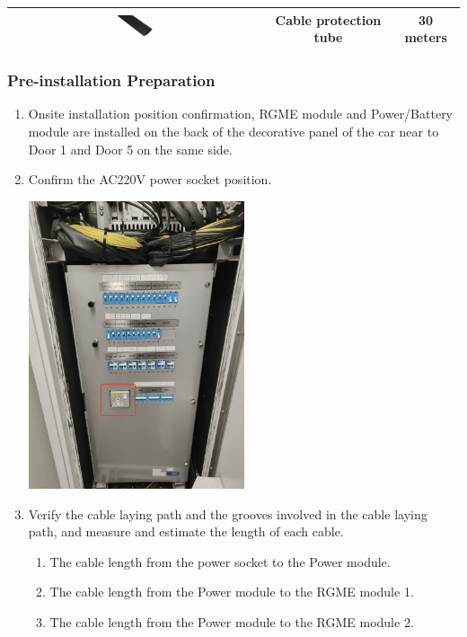 \documentclass{article}
\begin{document}
\begin{table}[H]
\begin{tabular}{|c|c|c|}
        \includegraphics[width=0.15\textwidth]{线缆保护管.png}                 & Cable protection tube                         & 30 meters\\ \hline
    \end{tabular}
\end{table}
\subsubsection{Pre-installation Preparation}
\begin{enumerate}
    \item Onsite installation position confirmation, RGME module and Power/Battery module are installed on the back of the decorative panel of the car near to Door 1 and Door 5 on the same side.
    \item Confirm the AC220V power socket position.
    \begin{center}
        \includegraphics[width=0.5\textwidth]{Power socket.jpg}
    \end{center}
    \item Verify the cable laying path and the grooves involved in the cable laying path, and measure and estimate the length of each cable.
    \begin{enumerate}
        \item The cable length from the power socket to the Power module.
        \item The cable length from the Power module to the RGME module 1.
        \item The cable length from the Power module to the RGME module 2.

\end{enumerate}
\end{enumerate}
\end{document}
